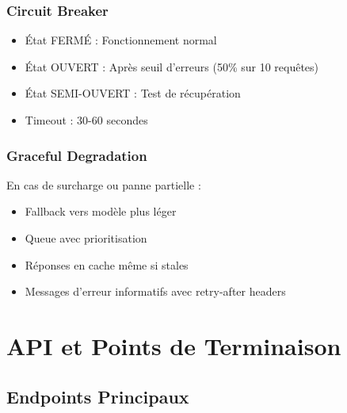 \documentclass[12pt,a4paper]{article}
\begin{document}
\subsubsection{Circuit Breaker}
\begin{tcolorbox}[
    enhanced,
    colback=danger!5,
    colframe=danger,
    title={\faPlug\ Protection contre les cascades de pannes},
    fonttitle=\bfseries\color{white},
    coltitle=white,
    colbacktitle=danger,
    arc=3mm
]
\begin{itemize}[leftmargin=*,label={\color{danger}\faCircle}]
    \item État FERMÉ : Fonctionnement normal
    \item État OUVERT : Après seuil d'erreurs (50\% sur 10 requêtes)
    \item État SEMI-OUVERT : Test de récupération
    \item Timeout : 30-60 secondes
\end{itemize}
\end{tcolorbox}

\subsubsection{Graceful Degradation}
En cas de surcharge ou panne partielle :
\begin{itemize}[leftmargin=*,label={\color{warning}\faArrowDown}]
    \item Fallback vers modèle plus léger
    \item Queue avec prioritisation
    \item Réponses en cache même si stales
    \item Messages d'erreur informatifs avec retry-after headers
\end{itemize}

\newpage
\section{ API et Points de Terminaison}

\subsection{Endpoints Principaux}
\end{document}

